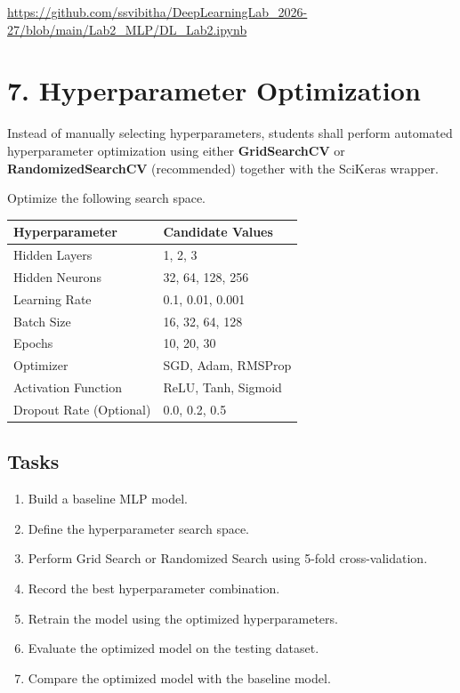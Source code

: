 \documentclass[11pt]{article}
\begin{document}
\url{https://github.com/ssvibitha/DeepLearningLab_2026-27/blob/main/Lab2_MLP/DL_Lab2.ipynb}


\section*{7. Hyperparameter Optimization}

Instead of manually selecting hyperparameters, students shall perform automated hyperparameter optimization using either \textbf{GridSearchCV} or \textbf{RandomizedSearchCV} (recommended) together with the SciKeras wrapper.

Optimize the following search space.

\begin{center}
\begin{tabular}{|p{5cm}|p{7cm}|}
\hline
Hyperparameter & Candidate Values\\
\hline
Hidden Layers & 1, 2, 3\\
Hidden Neurons & 32, 64, 128, 256\\
Learning Rate & 0.1, 0.01, 0.001\\
Batch Size & 16, 32, 64, 128\\
Epochs & 10, 20, 30\\
Optimizer & SGD, Adam, RMSProp\\
Activation Function & ReLU, Tanh, Sigmoid\\
Dropout Rate (Optional) & 0.0, 0.2, 0.5\\
\hline
\end{tabular}
\end{center}

\subsection*{Tasks}

\begin{enumerate}
\item Build a baseline MLP model.
\item Define the hyperparameter search space.
\item Perform Grid Search or Randomized Search using 5-fold cross-validation.
\item Record the best hyperparameter combination.
\item Retrain the model using the optimized hyperparameters.
\item Evaluate the optimized model on the testing dataset.
\item Compare the optimized model with the baseline model.
\end{enumerate}
\end{document}
